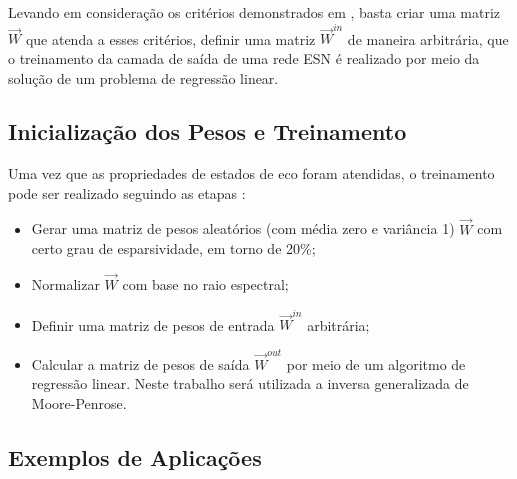 Levando em consideração os critérios demonstrados em , basta criar uma matriz $\vec{W}$ que atenda a esses critérios, definir uma matriz $\vec{W}^{in}$ de maneira arbitrária, que o treinamento da camada de saída de uma rede ESN é realizado por meio da solução de um problema de regressão linear.

\subsection{Inicialização dos Pesos e Treinamento}

%

Uma vez que as propriedades de estados de eco foram atendidas, o treinamento pode ser realizado seguindo as etapas \cite{jaeger2001,thesis:simeon2015,thesis:boccato2013}:

\begin{itemize}
	\item Gerar uma matriz de pesos aleatórios (com média zero e variância 1) $\vec{W}$ com certo grau de esparsividade, em torno de 20\%;
	\item Normalizar $\vec{W}$ com base no raio espectral;
	\item Definir uma matriz de pesos de entrada $\vec{W}^{in}$ arbitrária;
	\item Calcular a matriz de pesos de saída $\vec{W}^{out}$ por meio de um algoritmo de  regressão linear. Neste trabalho será utilizada a inversa generalizada de Moore-Penrose.
\end{itemize}

\subsection{Exemplos de Aplicações}


